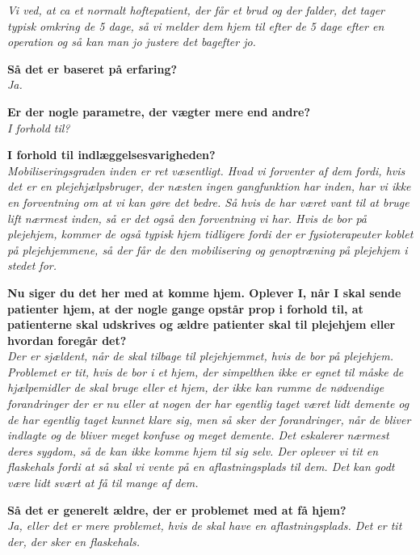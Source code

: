 \textit{Vi ved, at ca et normalt hoftepatient, der får et brud og der falder, det tager typisk omkring de 5 dage, så vi melder dem hjem til efter de 5 dage efter en operation og så kan man jo justere det bagefter jo.} \\
\noindent

\textbf{Så det er baseret på erfaring?} \\
\noindent
\textit{Ja.} \\
\noindent


\textbf{Er der nogle parametre, der vægter mere end andre? } \\
\noindent
\textit{I forhold til?} \\
\noindent

\textbf{I forhold til indlæggelsesvarigheden?} \\
\noindent
\textit{Mobiliseringsgraden inden er ret væsentligt. Hvad vi forventer af dem fordi, hvis det er en plejehjælpsbruger, der næsten ingen gangfunktion har inden, har vi ikke en forventning om at vi kan gøre det bedre. Så hvis de har været vant til at bruge lift nærmest inden,  så er det også den forventning vi har. Hvis de bor på plejehjem, kommer de også typisk hjem tidligere fordi der er fysioterapeuter koblet på plejehjemmene, så der får de den mobilisering og genoptræning på plejehjem i stedet for. } \\
\noindent


\textbf{Nu siger du det her med at komme hjem. Oplever I, når I skal sende patienter hjem, at der nogle gange opstår prop i forhold til, at patienterne skal udskrives og ældre patienter skal til plejehjem eller hvordan foregår det? } \\
\noindent
\textit{Der er sjældent, når de skal tilbage til plejehjemmet, hvis de bor på plejehjem. Problemet er tit, hvis de bor i et hjem, der simpelthen ikke er egnet til måske de hjælpemidler de skal bruge eller et hjem, der ikke kan rumme de nødvendige forandringer der er nu eller at nogen der har egentlig taget været lidt demente og de har egentlig taget kunnet klare sig, men så sker der forandringer, når de bliver indlagte og de bliver meget konfuse og meget demente. Det eskalerer nærmest deres sygdom, så de kan ikke komme hjem til sig selv. Der oplever vi tit en flaskehals fordi at så skal vi vente på en aflastningsplads til dem. Det kan godt være lidt svært at få til mange af dem.} \\
\noindent


\textbf{Så det er generelt ældre, der er problemet med at få hjem?} \\
\noindent
\textit{Ja, eller det er mere problemet, hvis de skal have en aflastningsplads. Det er tit der, der sker en flaskehals.}  \\
\noindent

